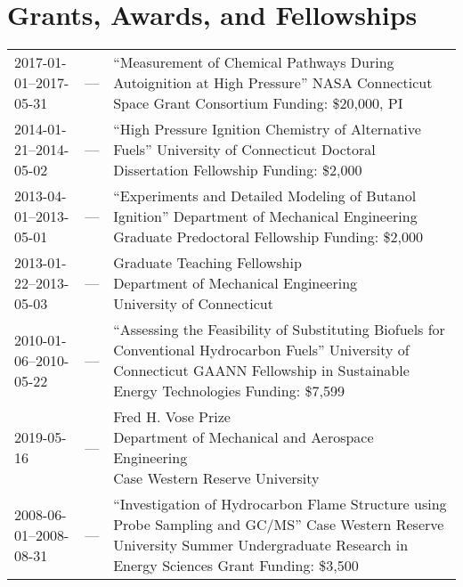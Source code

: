 \section{{\sectionfont Grants, Awards, and Fellowships}}
\vspace{-0.87cm}
\begin{center}
\begin{tabular}{lcl}
2017-01-01--2017-05-31 & --- & \makecell{``Measurement of Chemical Pathways During\\Autoignition at High Pressure'' \\ NASA Connecticut Space Grant Consortium \\ Funding: \$20,000, PI} \\
2014-01-21--2014-05-02 & --- & \makecell{``High Pressure Ignition Chemistry of Alternative\\Fuels'' \\
University of Connecticut Doctoral Dissertation\\Fellowship \\
Funding: \$2,000} \\
2013-04-01--2013-05-01 & --- & \makecell{``Experiments and Detailed Modeling of Butanol\\Ignition'' \\
Department of Mechanical Engineering Graduate\\Predoctoral Fellowship \\
Funding: \$2,000} \\
2013-01-22--2013-05-03 & --- & \makecell{Graduate Teaching Fellowship \\
Department of Mechanical Engineering\\University of Connecticut} \\
2010-01-06--2010-05-22 & --- & \makecell{``Assessing the Feasibility of Substituting Biofuels\\for Conventional Hydrocarbon Fuels'' \\
University of Connecticut GAANN Fellowship\\in Sustainable Energy Technologies \\
Funding: \$7,599} \\
2019-05-16 & --- & \makecell{Fred H. Vose Prize \\
Department of Mechanical and Aerospace Engineering\\Case Western Reserve University} \\
2008-06-01--2008-08-31 & --- & \makecell{``Investigation of Hydrocarbon Flame Structure\\using Probe Sampling and GC/MS'' \\
Case Western Reserve University Summer\\Undergraduate Research in Energy Sciences Grant \\
Funding: \$3,500}
\end{tabular}
\end{center}

